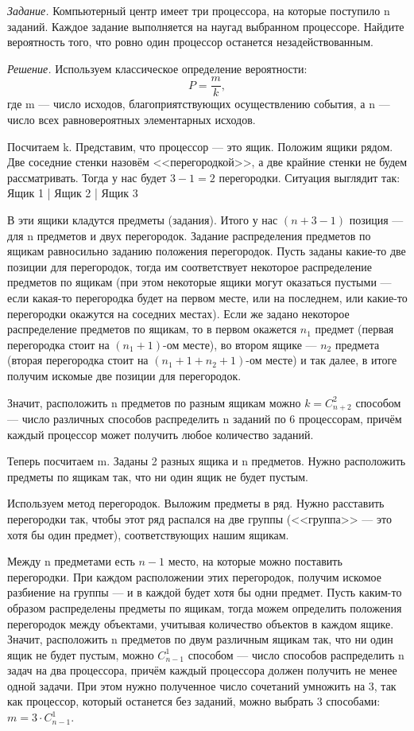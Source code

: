 \textit{Задание.} Компьютерный центр имеет три процессора, на которые поступило n заданий.
Каждое задание выполняется на наугад выбранном процессоре.
Найдите вероятность того, что ровно один процессор останется незадействованным.

\textit{Решение.} Используем классическое определение вероятности:
$$ P = \frac{m}{k},$$
где m --- число исходов, благоприятствующих осуществлению события, а n --- число всех равновероятных элементарных исходов.

Посчитаем k.
Представим, что процессор --- это ящик.
Положим ящики рядом.
Две соседние стенки назовём <<перегородкой>>, а две крайние стенки не будем рассматривать.
Тогда у нас будет $ 3 - 1 = 2 $ перегородки.
Ситуация выглядит так: Ящик 1 | Ящик 2 | Ящик 3

В эти ящики кладутся предметы (задания).
Итого у нас $ \left( n + 3 - 1 \right) $ позиция --- для n предметов и двух перегородок.
Задание распределения предметов по ящикам равносильно заданию положения перегородок.
Пусть заданы какие-то две позиции для перегородок,
тогда им соответствует некоторое распределение предметов по ящикам
(при этом некоторые ящики могут оказаться пустыми ---
если какая-то перегородка будет на первом месте,
или на последнем, или какие-то перегородки окажутся на соседних местах).
Если же задано некоторое распределение предметов по ящикам,
то в первом окажется $ n_1 $  предмет
(первая перегородка стоит на
$ \left( n_1 + 1 \right) $-ом месте),
во втором ящике --- $ n_2 $ предмета
(вторая перегородка стоит на
$ \left( n_1 + 1 + n_2 +1 \right) $-ом месте)
и так далее, в итоге получим искомые две позиции для перегородок.

Значит, расположить n предметов по разным ящикам можно
$ k = C_{n+2}^{2} $ способом ---
число различных способов распределить n заданий по 6 процессорам,
причём каждый процессор может получить любое количество заданий.

Теперь посчитаем m.
Заданы 2 разных ящика и n предметов.
Нужно расположить предметы по ящикам так, что ни один ящик не будет пустым.

Используем метод перегородок.
Выложим предметы в ряд.
Нужно расставить перегородки так,
чтобы этот ряд распался на две группы (<<группа>> --- это хотя бы один предмет), соответствующих нашим ящикам.

Между n предметами есть $n-1$ место, на которые можно поставить перегородки.
При каждом расположении этих перегородок, получим искомое разбиение на группы --- и в каждой будет хотя бы одни предмет.
Пусть каким-то образом распределены предметы по ящикам, тогда можем определить положения перегородок между объектами,
учитывая количество объектов в каждом ящике.
Значит,
расположить n предметов по двум различным ящикам так,
что ни один ящик не будет пустым,
можно $ C_{n-1}^1 $ способом ---
число способов распределить n задач на два процессора,
причём каждый процессора должен получить не менее одной задачи.
При этом нужно полученное число сочетаний умножить на 3,
так как процессор, который останется без заданий, можно выбрать 3 способами: $ m = 3 \cdot C_{n-1}^1 $.

